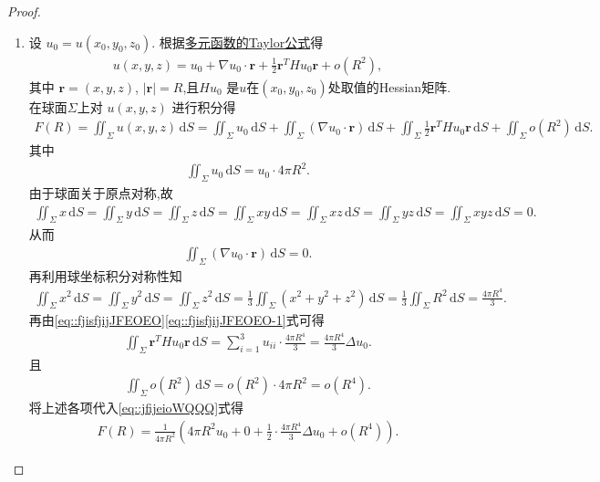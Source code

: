 \documentclass[../../main.tex]{subfiles}%
\begin{document}
\begin{proof}
\begin{enumerate}[(1)]
\item 设 \(u_0 = u(x_0, y_0, z_0)\). 根据\hyperref[theorem:多元函数带Peano余项的Taylor公式]{多元函数的Taylor公式}得
\begin{align*}
u(x, y, z) = u_0 + \nabla u_0 \cdot \bm{r} + \frac{1}{2} \bm{r}^T H u_0 \bm{r} + o(R^2),
\end{align*}
其中 \(\bm{r} = (x, y, z)\), \(|\bm{r}| = R\),且\(Hu_0\) 是$u$在$(x_0,y_0,z_0)$处取值的Hessian矩阵.
在球面$\Sigma$上对 \(u(x, y, z)\) 进行积分得
\begin{align}
F(R)=\iint_{\Sigma} u(x, y, z)\, \mathrm{d}S = \iint_{\Sigma} u_0\, \mathrm{d}S + \iint_{\Sigma} (\nabla u_0 \cdot \bm{r})\, \mathrm{d}S + \iint_{\Sigma} \frac{1}{2} \bm{r}^T H u_0 \bm{r}\, \mathrm{d}S + \iint_{\Sigma} o(R^2)\, \mathrm{d}S .\label{eq::jfijeioWQQQ}
\end{align}
其中
\begin{align*}
\iint_{\Sigma} u_0\, \mathrm{d}S = u_0 \cdot 4\pi R^2.
\end{align*}
由于球面关于原点对称,故
\begin{align}\label{eq::fjisfjijJFEOEO}
\iint_{\Sigma}{x\,\mathrm{d}S}=\iint_{\Sigma}{y\,\mathrm{d}S}=\iint_{\Sigma}{z\,\mathrm{d}S}=\iint_{\Sigma}{xy\,\mathrm{d}S}=\iint_{\Sigma}{xz\,\mathrm{d}S}=\iint_{\Sigma}{yz\,\mathrm{d}S}=\iint_{\Sigma}{xyz\,\mathrm{d}S}=0.
\end{align}
从而
\begin{align*}
\iint_{\Sigma} (\nabla u_0 \cdot \bm{r})\, \mathrm{d}S = 0.
\end{align*}
再利用球坐标积分对称性知
\begin{align}\label{eq::fjisfjijJFEOEO-1}
\iint_{\Sigma} x^2\, \mathrm{d}S = \iint_{\Sigma} y^2\, \mathrm{d}S = \iint_{\Sigma} z^2\, \mathrm{d}S = \frac{1}{3} \iint_{\Sigma} (x^2+y^2+z^2)\, \mathrm{d}S = \frac{1}{3} \iint_{\Sigma} R^2\, \mathrm{d}S = \frac{4\pi R^4}{3}.
\end{align}
再由\eqref{eq::fjisfjijJFEOEO}\eqref{eq::fjisfjijJFEOEO-1}式可得
\begin{align*}
\iint_{\Sigma} \bm{r}^T H u_0 \bm{r}\, \mathrm{d}S = \sum\limits_{i=1}^3 u_{ii} \cdot \frac{4\pi R^4}{3} = \frac{4\pi R^4}{3} \Delta u_0.
\end{align*}
且
\begin{align*}
\iint_{\Sigma} o(R^2)\, \mathrm{d}S = o(R^2) \cdot 4\pi R^2 = o(R^4).
\end{align*}
将上述各项代入\eqref{eq::jfijeioWQQQ}式得
\begin{align*}
F(R) = \frac{1}{4\pi R^2} \left( 4\pi R^2 u_0 + 0 + \frac{1}{2} \cdot \frac{4\pi R^4}{3} \Delta u_0 + o(R^4) \right).

\end{align*}
\end{enumerate}
\end{proof}
\end{document}
